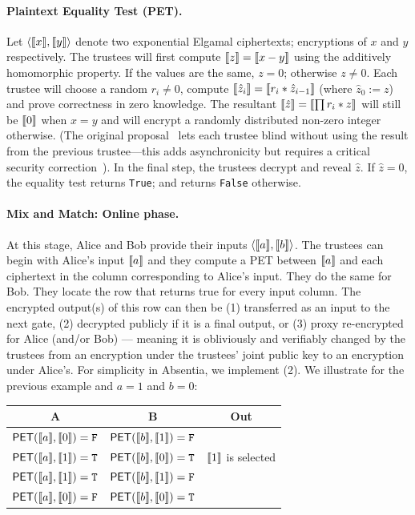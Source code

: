 \paragraph{Plaintext Equality Test (PET).} Let $\left \langle \llbracket x \rrbracket,\llbracket y \rrbracket \right \rangle$ denote two exponential Elgamal ciphertexts; encryptions of $x$ and $y$ respectively. The trustees will first compute $\llbracket z \rrbracket=\llbracket x-y \rrbracket$ using the additively homomorphic property. If the values are the same, $z=0$; otherwise $z\neq 0$. Each trustee will choose a random $r_i\neq0$, compute $\llbracket \hat{z}_i \rrbracket=\llbracket r_i*\hat{z}_{i-1} \rrbracket$ (where $\hat{z}_0:=z$) and prove correctness in zero knowledge. The resultant $\llbracket \hat{z} \rrbracket=\llbracket \prod r_i*z \rrbracket$ will still be $\llbracket 0 \rrbracket$ when $x=y$ and will encrypt a randomly distributed non-zero integer otherwise. (The original proposal~\cite{JJ00} lets each trustee blind without using the result from the previous trustee---this adds asynchronicity but requires a critical security correction~\cite{mcmurtry2020test}). In the final step, the trustees decrypt and reveal $\hat{z}$. If $\hat{z} = 0$, the equality test returns \texttt{True}; and returns \texttt{False} otherwise.

\paragraph{Mix and Match: Online phase.} At this stage, Alice and Bob provide their inputs $\left \langle \llbracket a \rrbracket,\llbracket b \rrbracket \right \rangle$. The trustees can begin with Alice's input $\llbracket a \rrbracket$ and they compute a PET between $\llbracket a \rrbracket$ and each ciphertext in the column corresponding to Alice's input. They do the same for Bob. They locate the row that returns true for every input column. The encrypted output(s) of this row can then be (1) transferred as an input to the next gate, (2) decrypted publicly if it is a final output, or (3) proxy re-encrypted for Alice (and/or Bob) --- meaning it is obliviously and verifiably changed by the trustees from an encryption under the trustees' joint public key to an encryption under Alice's. For simplicity in Absentia, we implement (2). We illustrate for the previous example and $a=1$ and $b=0$:

\begin{center}
\begin{tabular}{|c|c|c|}
  \hline
  A			& 	B			& 	Out   			\\ \hline
  $\mathsf{PET}(\llbracket a \rrbracket,\llbracket 0 \rrbracket) = \mathtt{F}$ 	&	$\mathsf{PET}(\llbracket b \rrbracket,\llbracket 1 \rrbracket) = \mathtt{F}$ 	&  	 		\\ \hline
  $\mathsf{PET}(\llbracket a \rrbracket,\llbracket 1 \rrbracket) = \mathtt{T}$ 	&	$\mathsf{PET}(\llbracket b \rrbracket,\llbracket 0 \rrbracket) = \mathtt{T}$ 	&  $\llbracket 1 \rrbracket$ is selected  	\\ \hline
  $\mathsf{PET}(\llbracket a \rrbracket,\llbracket 1 \rrbracket) = \mathtt{T}$ 	&	$\mathsf{PET}(\llbracket b \rrbracket,\llbracket 1 \rrbracket) = \mathtt{F}$ 	&  	 		\\ \hline
  $\mathsf{PET}(\llbracket a \rrbracket,\llbracket 0 \rrbracket) = \mathtt{F}$ 	&	$\mathsf{PET}(\llbracket b \rrbracket,\llbracket 0 \rrbracket) = \mathtt{T}$ 	& 	 		\\ \hline
\end{tabular}
\end{center}

